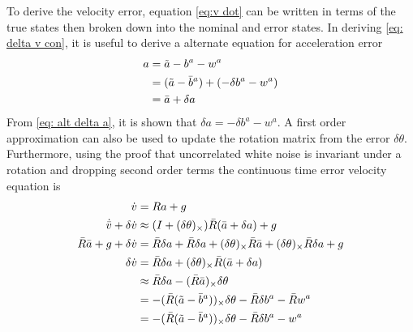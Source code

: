 To derive the velocity error, equation \eqref{eq:v dot} can be written in terms of the true states then broken down into the nominal and error states. In deriving \eqref{eq: delta v con}, it is useful to derive a alternate equation for acceleration error 
\begin{equation}
    \begin{split}
        a &= \Tilde{a} - b^a - w^a \\
          &= (\Tilde{a} - \bar{b}^a) + (-\delta b^a - w^a) \\
          &= \bar{a} + \delta a
    \end{split}
    \label{eq: alt delta a}
\end{equation}
From \eqref{eq: alt delta a}, it is shown that $\delta a = -\delta b^a - w^a$. A first order approximation can also be used to update the rotation matrix from the error $\delta \theta$. Furthermore, using the proof that uncorrelated white noise is invariant under a rotation \cite{Quaternion_Kinematics_for_the_Error-state_EKF} and dropping second order terms the continuous time error velocity equation is
\begin{equation}
    \begin{split}
        \dot{v} &= R a + g \\
        \dot{\bar{v}} + \delta \dot{v} &\approx (I + (\delta \theta)_{\times}) \bar{R} (\bar{a} + \delta a) + g\\
        \bar{R} \bar{a} + g + \delta{\dot{v}} &= \bar{R} \delta a + \bar{R} \delta a + (\delta \theta)_{\times} \bar{R} \bar{a} + (\delta \theta)_{\times} \bar{R} \delta a + g\\
        \delta \dot{v} &=\bar{R} \delta a + (\delta \theta)_{\times} \bar{R} (\bar{a} + \delta a)\\
         &\approx \bar{R} \delta a - (\bar{R} \bar{a})_{\times} \delta \theta\\
         &=  -(\bar{R} (\Tilde{a} - \bar{b}^a))_{\times} \delta \theta - \bar{R} \delta b^a - \bar{R} w^a\\
         &=  -(\bar{R} (\Tilde{a} - \bar{b}^a))_{\times} \delta \theta - \bar{R} \delta b^a - w^a\\
    \end{split}
    \label{eq: delta v con}
\end{equation}

